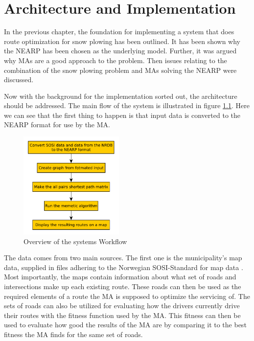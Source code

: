 \chapter{Architecture and Implementation}
\label{architecture_and_implementation}

In the previous chapter, the foundation for implementing a system that does route optimization for snow plowing has been outlined. It has been shown why the NEARP has been chosen as the underlying model. Further, it was argued why MAs are a good approach to the problem. Then issues relating to the combination of the snow plowing problem and MAs solving the NEARP were discussed.

Now with the background for the implementation sorted out, the architecture should be addressed. The main flow of the system is illustrated in figure \ref{fig:system_flowchart}. Here we can see that the first thing to happen is that input data is converted to the NEARP format \citep{NEARPdocumentationSINTEF} for use by the MA.

\begin{figure}
    \begin{center}
        \includegraphics[width=0.46\textwidth]{figures/Architecture/Overal_system_workflow.pdf}
    \end{center}
    \caption{Overview of the systems Workflow}
    \label{fig:system_flowchart}
\end{figure}

The data comes from two main sources. The first one is the municipality's map data, supplied in files adhering to the Norwegian SOSI-Standard for map data \citep{kartverketSOSI}. Most importantly, the maps contain information about what set of roads and intersections make up each existing route. These roads can then be used as the required elements of a route the MA is supposed to optimize the servicing of. The sets of roads can also be utilized for evaluating how the drivers currently drive their routes with the fitness function used by the MA. This fitness can then be used to evaluate how good the results of the MA are by comparing it to the best fitness the MA finds for the same set of roads.

